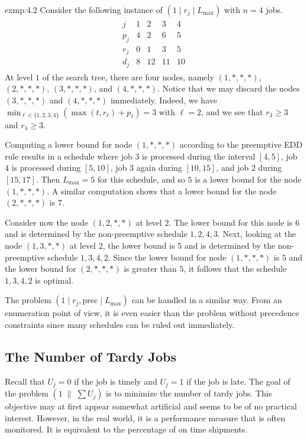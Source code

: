 \begin{exmp}{exmp:4.2}
    Consider the following instance of $(1 \mid r_j \mid L_{\max})$ with 
    $n = 4$ jobs. 
    \begin{align*}
        \begin{array}{c|cccc} 
            j & 1 & 2 & 3 & 4 \\ \hline 
            p_j & 4 & 2 & 6 & 5 \\ 
            r_j & 0 & 1 & 3 & 5 \\ 
            d_j & 8 & 12 & 11 & 10 
        \end{array}
    \end{align*}
    At level $1$ of the search tree, there are four nodes, namely 
    $(1, *, *, *)$, $(2, *, *, *)$, $(3, *, *, *)$, and $(4, *, *, *)$. 
    Notice that we may discard the nodes $(3, *, *, *)$ and 
    $(4, *, *, *)$ immediately. Indeed, we have $\min_{\ell\in \{1, 2, 3, 4\}} 
    (\max(t, r_\ell) + p_\ell) = 3$ with $\ell = 2$, and we see that 
    $r_3 \geq 3$ and $r_4 \geq 3$. 

    Computing a lower bound for node $(1, *, *, *)$ according to the 
    preemptive EDD rule results in a schedule where job $3$ is processed 
    during the interval $[4, 5]$, job $4$ is processed during $[5, 10]$, 
    job $3$ again during $[10, 15]$, and job $2$ during $[15, 17]$. 
    Then $L_{\max} = 5$ for this schedule, and so $5$ is a lower bound 
    for the node $(1, *, *, *)$. A similar computation shows that a lower 
    bound for the node $(2, *, *, *)$ is $7$. 

    Consider now the node $(1, 2, *, *)$ at level $2$. The lower bound 
    for this node is $6$ and is determined by the non-preemptive 
    schedule $1, 2, 4, 3$. Next, looking at the node $(1, 3, *, *)$ 
    at level $2$, the lower bound is $5$ and is determined by the 
    non-preemptive schedule $1, 3, 4, 2$. Since the lower bound for node 
    $(1, *, *, *)$ is $5$ and the lower bound for $(2, *, *, *)$ is 
    greater than $5$, it follows that the schedule $1, 3, 4, 2$ is optimal. 
\end{exmp}

The problem $(1 \mid r_j, \text{prec} \mid L_{\max})$ can be handled in a similar 
way. From an enumeration point of view, it is even easier than the problem 
without precedence constraints since many schedules can be ruled out 
immediately. 

\subsection{The Number of Tardy Jobs} \label{subsec:4.2}
Recall that $U_j = 0$ if the job is timely and $U_j = 1$ if the job is late. 
The goal of the problem $(1\;\|\;\sum U_j)$ is to minimize the number of 
tardy jobs. This objective may at first appear somewhat artificial and 
seems to be of no practical interest. However, in the real world, it is a 
performance measure that is often monitored. It is equivalent to the 
percentage of on time shipments.

